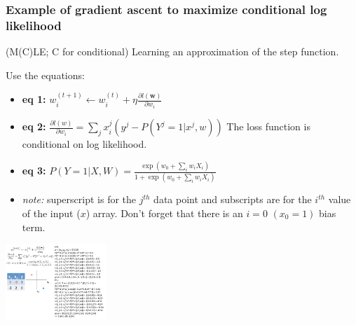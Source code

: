 \subsubsection{Example of gradient ascent to maximize conditional log likelihood}
(M(C)LE; C for conditional) \hfill
Learning an approximation of the step function.  %

Use the equations: \hfill \\
\begin{itemize}
	\item \textbf{eq 1:} $w_i^{(t+1)} \leftarrow w_i^{(t)} + \eta \frac{\partial l(\bm{w})}{\partial w_i}$
	\item \textbf{eq 2:} $\displaystyle \frac{\partial l(w)}{\partial w_i} = \sum_j x_i^j (y^j - P(Y^j = 1 | x^j, w))$
			 The loss function is conditional on log likelihood.  %
	\item \textbf{eq 3:} $P(Y=1 | X, W) = \frac{\exp(w_0 + \sum_i w_i X_i)}{1 + \exp(w_0 + \sum_i w_i X_i)}$
	\item \textit{note:} superscript is for the $j^{th}$ data point and 
			subscripts are for the $i^{th}$ value of the input ($x$) array.  
			Don't forget that there is an $i=0$ $(x_0 = 1)$ bias term. 
\end{itemize}
\includegraphics[width=1.5in]{figures/gradient_ascent_logistic_regression.pdf}   \hfill \\
